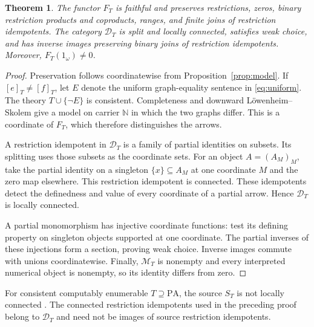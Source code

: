 \documentclass[11pt]{article}
\newtheorem{theorem}{Theorem}[section]
\newcommand{\N}{\mathbb N}
\newcommand{\PA}{\mathrm{PA}}
\begin{document}
\begin{theorem}\label{thm:faithful}
The functor $F_T$ is faithful and preserves restrictions, zeros, binary
restriction products and coproducts, ranges, and finite joins of
restriction idempotents. The category
$\mathcal D_T$ is split and locally connected, satisfies weak choice,
and has inverse images preserving binary joins of restriction
idempotents. Moreover,
$F_T(1_\omega)\ne0$.
\end{theorem}
\begin{proof}
Preservation follows coordinatewise from Proposition~\ref{prop:model}.
If $[e]_T\ne[f]_T$, let $E$ denote the uniform graph-equality sentence
in \eqref{eq:uniform}. The theory $T\cup\{\neg E\}$ is consistent.
Completeness and downward L\"owenheim--Skolem give a model on carrier
$\N$ in which the two graphs differ. This is a coordinate of $F_T$,
which therefore distinguishes the arrows.

A restriction idempotent in $\mathcal D_T$ is a family of partial
identities on subsets. Its splitting uses those subsets as the
coordinate sets. For an object $A=(A_M)_M$, take the partial identity
on a singleton $\{x\}\subseteq A_M$ at one coordinate $M$ and the zero
map elsewhere. This restriction idempotent is connected. These
idempotents detect the definedness and value of every coordinate of a partial arrow. Hence
$\mathcal D_T$ is locally connected.

A partial monomorphism has injective coordinate functions: test its
defining property on singleton objects supported at one coordinate.
The partial inverses of these injections form a section, proving weak
choice. Inverse images commute with unions coordinatewise. Finally,
$\mathcal M_T$ is nonempty and every interpreted numerical object is
nonempty, so its identity differs from zero.
\end{proof}

For consistent computably enumerable $T\supseteq\PA$, the source $S_T$
is not locally connected \cite[Corollary 4.4, pp.~657--658]{DPM}.
The connected restriction idempotents used in the preceding proof
belong to $\mathcal D_T$ and need not be images of source restriction
idempotents.
\end{document}
